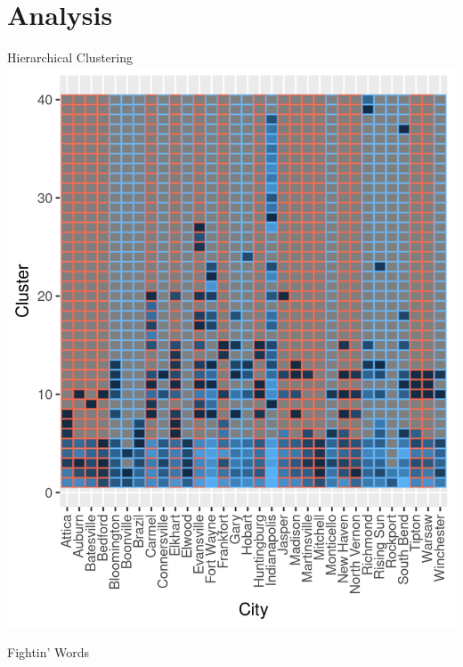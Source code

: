 \documentclass[12pt]{beamer}
\begin{document}
\section{Analysis}
\begin{frame}{Hierarchical Clustering}
\centering
\includegraphics[height=\textheight]{../figures/heatmap_hclust_40.png}
\end{frame}

\begin{frame}{Fightin' Words}
\begin{figure}
	\hfill
	\hfill
\end{figure}
\end{frame}
\end{document}
